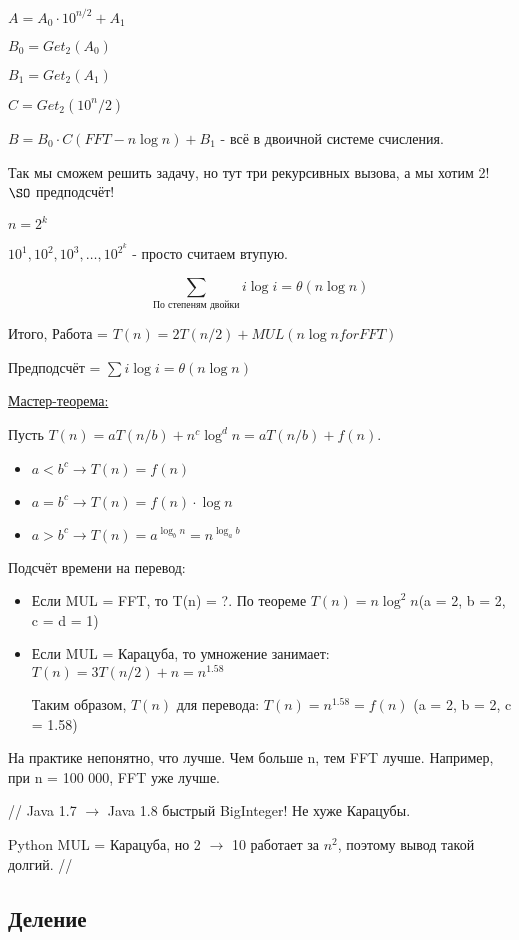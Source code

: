$A = A_0 \cdot 10^{n/2} + A_1$

$B_0 = Get_2(A_0)$

$B_1 = Get_2(A_1)$

$C = Get_2(10^n/2)$

$B = B_0 \cdot C (FFT - n \log n) + B_1$ - всё в двоичной системе счисления.

Так мы сможем решить задачу, но тут три рекурсивных вызова, а мы хотим 2! $\SO$ предподсчёт!

$n = 2^k$

$10^1, 10^2, 10^3, \dots, 10^{2^k}$ - просто считаем втупую.

\[ \sum\limits_{\text{По степеням двойки}} i \log i = \theta (n \log n) \]

Итого, Работа = $T(n) = 2T(n/2) + MUL(n \log n for FFT)$

Предподсчёт = $\sum i \log i = \theta(n \log n)$

\underline{Мастер-теорема:}

Пусть $T(n) = aT(n/b) + n^c\log^d n = aT(n/b) + f(n)$.
\begin{itemize}
	\item $a < b^c \rightarrow T(n) = f(n)$
	\item $a = b^c \rightarrow T(n) = f(n)\cdot\log n$
	\item $a > b^c \rightarrow T(n) = a^{\log_b n} = n^{\log_a b}$
\end{itemize}

Подсчёт времени на перевод:
\begin{itemize}
	\item Если MUL = FFT, то T(n) = ?. По теореме $T(n) = n\log^2 n$(a = 2, b = 2, c = d = 1)
	\item Если MUL = Карацуба, то умножение занимает: $T(n) = 3T(n/2) + n = n^{1.58}$
	
	Таким образом, $T(n)$ для перевода: $T(n) = n^{1.58} = f(n)$ (a = 2, b = 2, c = 1.58)	
\end{itemize}

На практике непонятно, что лучше. Чем больше n, тем FFT лучше. Например, при n = 100 000, FFT уже лучше.

// Java 1.7 $\rightarrow$ Java 1.8 быстрый BigInteger! Не хуже Карацубы.

Python MUL = Карацуба, но 2 $\rightarrow$ 10 работает за $n^2$, поэтому вывод такой долгий. //

\subsection{Деление}

